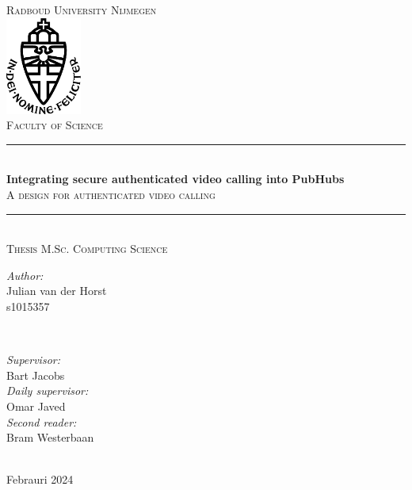 \documentclass{report}
\title{\thesistitle}
\author{\thesisauthorfirst\space\thesisauthorsecond}
\date{\thesisdate}
\newcommand{\thesistitle}{Integrating secure authenticated video calling into PubHubs}
\newcommand{\thesissubtitle}{A design for authenticated video calling}
\newcommand\thesisauthorfirst{Julian van der Horst \\ s1015357}
\newcommand\thesisauthorsecond{\null}
\newcommand\thesissupervisorfirst{Bart Jacobs}
\newcommand\thesissupervisorsecond{Omar Javed}
\newcommand\thesissecondreadersecond{Bram Westerbaan}
\newcommand\thesisdate{Febrauri 2024}
\begin{document}
\begin{titlepage}
\thispagestyle{empty}
\newcommand{\HRule}{\rule{\linewidth}{0.5mm}}
\center
\textsc{\Large Radboud University Nijmegen}\\[.7cm]
\includegraphics[width=25mm]{img/in_dei_nomine_feliciter}\\[.5cm]
\textsc{Faculty of Science}\\[0.5cm]

\HRule \\[0.4cm]
{ \huge \bfseries \thesistitle}\\[0.1cm]
\textsc{\thesissubtitle}\\
\HRule \\[.5cm]
\textsc{\large Thesis M.Sc. Computing Science}\\[.5cm]

\begin{minipage}{0.4\textwidth}
    \begin{flushleft}
        \large
        \emph{Author:}\\
        \thesisauthorfirst\space \textsc{\thesisauthorsecond}
    \end{flushleft}
\end{minipage}
~
\begin{minipage}{0.4\textwidth}
    \begin{flushright}
        \large
        \emph{Supervisor:} \\
        \thesissupervisorfirst  \\[1em]
        \emph{Daily supervisor:} \\
        \thesissupervisorsecond \\[1em]
        \emph{Second reader:} \\
        \thesissecondreadersecond \\[1em]
    \end{flushright}
\end{minipage}\\[4cm]
\vfill
{\large \thesisdate}\\
\end{titlepage}

\newpage
\end{document}
